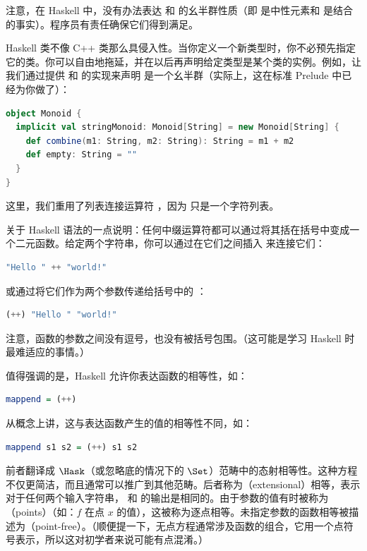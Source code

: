 注意，在 Haskell 中，没有办法表达  和  的幺半群性质（即  是中性元素和  是结合的事实）。程序员有责任确保它们得到满足。

Haskell 类不像 C++ 类那么具侵入性。当你定义一个新类型时，你不必预先指定它的类。你可以自由地拖延，并在以后再声明给定类型是某个类的实例。例如，让我们通过提供  和  的实现来声明  是一个幺半群（实际上，这在标准 Prelude 中已经为你做了）：

\begin{lstlisting}[language=Scala]
object Monoid {
  implicit val stringMonoid: Monoid[String] = new Monoid[String] {
    def combine(m1: String, m2: String): String = m1 + m2
    def empty: String = ""
  }
}
\end{lstlisting}
这里，我们重用了列表连接运算符 \code{(++)}，因为  只是一个字符列表。

关于 Haskell 语法的一点说明：任何中缀运算符都可以通过将其括在括号中变成一个二元函数。给定两个字符串，你可以通过在它们之间插入 \code{++} 来连接它们：

\begin{lstlisting}[language=Haskell]
  "Hello " ++ "world!"
\end{lstlisting}
或通过将它们作为两个参数传递给括号中的 \code{(++)}：

\begin{lstlisting}[language=Haskell]
(++) "Hello " "world!"
\end{lstlisting}
注意，函数的参数之间没有逗号，也没有被括号包围。（这可能是学习 Haskell 时最难适应的事情。）

值得强调的是，Haskell 允许你表达函数的相等性，如：

\begin{lstlisting}[language=Haskell]
  mappend = (++)
\end{lstlisting}
从概念上讲，这与表达函数产生的值的相等性不同，如：

\begin{lstlisting}[language=Haskell]
  mappend s1 s2 = (++) s1 s2
\end{lstlisting}
前者翻译成 $\Hask$（或忽略底的情况下的 $\Set$）范畴中的态射相等性。这种方程不仅更简洁，而且通常可以推广到其他范畴。后者称为（extensional）相等，表示对于任何两个输入字符串， 和 \code{(++)} 的输出是相同的。由于参数的值有时被称为（points）（如：$f$ 在点 $x$ 的值），这被称为逐点相等。未指定参数的函数相等被描述为（point-free）。（顺便提一下，无点方程通常涉及函数的组合，它用一个点符号表示，所以这对初学者来说可能有点混淆。）

